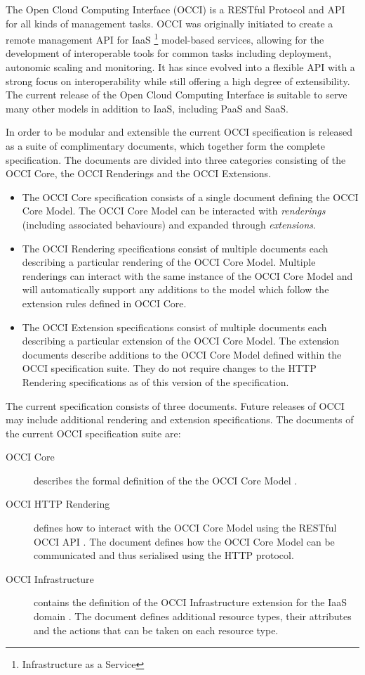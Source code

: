 The Open Cloud Computing Interface (OCCI) is a RESTful Protocol and
API for all kinds of management tasks. OCCI was originally initiated
to create a remote management API for IaaS%
\footnote{Infrastructure as a Service}
model-based services, allowing for the development of interoperable tools for
common tasks including deployment, autonomic scaling and monitoring.
%
It has since evolved into a flexible API with a strong focus on
interoperability while still offering a high degree of extensibility. The
current release of the Open Cloud Computing Interface is suitable to serve many
other models in addition to IaaS, including PaaS and SaaS.

In order to be modular and extensible the current OCCI specification is
released as a suite of complimentary documents, which together form the complete
specification.
%
The documents are divided into three categories consisting of the OCCI Core,
the OCCI Renderings and the OCCI Extensions.
%
\begin{itemize}
\item The OCCI Core specification consists of a single document defining the
 OCCI Core Model. The OCCI Core Model can be interacted with {\em
 renderings} (including associated behaviours) and expanded through {\em extensions}.
\item The OCCI Rendering specifications consist of multiple documents each
 describing a particular rendering of the OCCI Core Model. Multiple renderings can
 interact with the same instance of the OCCI Core Model and will automatically support
 any additions to the model which follow the extension rules defined in OCCI
 Core.
\item The OCCI Extension specifications consist of multiple documents each
 describing a particular extension of the OCCI Core Model. The extension documents
 describe additions to the OCCI Core Model defined within the OCCI specification
 suite. They do not require changes to the HTTP Rendering specifications as of this version of the specification.
\end{itemize}
%
The current specification consists of three documents.
Future releases of OCCI may include additional rendering and extension
specifications. The documents of the current OCCI specification suite are:

\begin{description}
\item[OCCI Core] describes the formal definition of the the OCCI Core Model
\cite{occi:core}.
\item[OCCI HTTP Rendering] defines how to interact with the OCCI Core Model using the
RESTful OCCI API \cite{occi:http_rendering}. The document defines how the OCCI Core Model can
be communicated and thus serialised using the HTTP protocol.
\item[OCCI Infrastructure] contains the definition of the OCCI Infrastructure
extension for the IaaS domain \cite{occi:infrastructure}. The document defines
additional resource types, their attributes and the actions that can be taken
on each resource type.
\end{description}
